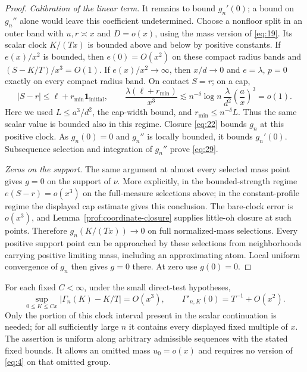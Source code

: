 \begin{proof}
\emph{Calibration of the linear term.}
It remains to bound $g_n'(0)$; a bound on $g_n''$ alone would leave
this coefficient undetermined. Choose a nonfloor split in an
outer band with $u,r\asymp x$ and $D=o(x)$, using the mass version
of \eqref{eq:19}. Its scalar clock $K/(Tx)$ is bounded above and
below by positive constants. If $e(x)/x^2$ is bounded, then
$e(0)=O(x^2)$ on these compact radius bands and
$(S-K/T)/x^3=O(1)$. If $e(x)/x^2\to\infty$, then $x/d\to0$ and
$e=\lambda$, $p=0$ exactly on every compact radius band. On contact
$S=r$; on a cap,
\[
 |S-r|\le \ell+r_{\min}\mathbf1_{\mathrm{initial}},\qquad
 \frac{\lambda(\ell+r_{\min})}{x^3}
 \lesssim n^{-\delta}\log n\,
          \frac{\lambda}{d^2}\left(\frac ax\right)^3=o(1).
\]
Here we used $L\le a^3/d^2$, the cap-width bound, and
$r_{\min}\le n^{-\delta}L$. Thus the same scalar value is bounded
also in this regime. Closure \eqref{eq:22} bounds $g_n$ at this
positive clock. As $g_n(0)=0$ and $g_n''$ is locally bounded, it
bounds $g_n'(0)$. Subsequence selection and integration of $g_n''$
prove \eqref{eq:29}.

\emph{Zeros on the support.}
The same argument at almost every selected mass point gives $g=0$
on the support of $\nu$. More explicitly, in the bounded-strength
regime $e(S-r)=o(x^3)$ on the full-measure selections above; in the
constant-profile regime the displayed cap estimate gives this
conclusion. The bare-clock error is $o(x^3)$, and
Lemma~\ref{prof:coordinate-closure} supplies little-oh closure at
such points. Therefore $g_n(K/(Tx))\to0$ on full normalized-mass
selections. Every positive support point can be approached by these
selections from neighborhoods carrying positive limiting mass,
including an approximating atom. Local uniform convergence of $g_n$
then gives $g=0$ there. At zero use $g(0)=0$.
\end{proof}

\begin{lemma}
\label{prof:low-clock-linearization}
For each fixed $C<\infty$, under the small direct-test hypotheses,
\[
 \sup_{0\le K\le Cx}|\Gamma_n(K)-K/T|=O(x^3),
 \qquad \Gamma'_{n,K}(0)=T^{-1}+O(x^2).
\]
Only the portion of this clock interval present in the scalar
continuation is needed; for all sufficiently large $n$ it contains
every displayed fixed multiple of $x$. The assertion is uniform
along arbitrary admissible sequences with the stated fixed bounds.
It allows an omitted mass $u_0=o(x)$ and requires no version of
\eqref{eq:4} on that omitted group.
\end{lemma}


